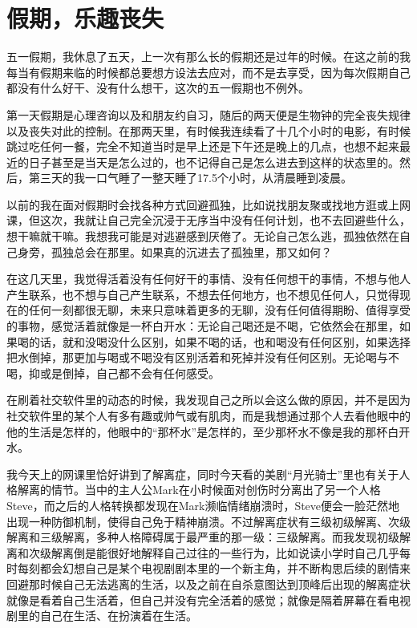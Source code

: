 \chapter{假期，乐趣丧失}








五一假期，我休息了五天，上一次有那么长的假期还是过年的时候。在这之前的我每当有假期来临的时候都总要想方设法去应对，而不是去享受，因为每次假期自己都没有什么好干、没有什么想干，这次的五一假期也不例外。

第一天假期是心理咨询以及和朋友约自习，随后的两天便是生物钟的完全丧失规律以及丧失对此的控制。在那两天里，有时候我连续看了十几个小时的电影，有时候跳过吃任何一餐，完全不知道当时是早上还是下午还是晚上的几点，也想不起来最近的日子甚至是当天是怎么过的，也不记得自己是怎么进去到这样的状态里的。然后，第三天的我一口气睡了一整天\pozhehao{}睡了17.5个小时，从清晨睡到凌晨。

以前的我在面对假期时会找各种方式回避孤独，比如说找朋友聚或找地方逛或上网课，但这次，我就让自己完全沉浸于无序当中\pozhehao{}没有任何计划，也不去回避些什么，想干嘛就干嘛。我想我可能是对逃避感到厌倦了。无论自己怎么逃，孤独依然在自己身旁，孤独总会在那里。如果真的沉进去了孤独里，那又如何？

在这几天里，我觉得活着没有任何好干的事情、没有任何想干的事情，不想与他人产生联系，也不想与自己产生联系，不想去任何地方，也不想见任何人，只觉得现在的任何一刻都很无聊，未来只意味着更多的无聊，没有任何值得期盼、值得享受的事物，感觉活着就像是一杯白开水：无论自己喝还是不喝，它依然会在那里，如果喝的话，就和没喝没什么区别，如果不喝的话，也和喝没有任何区别，如果选择把水倒掉，那更加与喝或不喝没有区别\pozhehao{}活着和死掉并没有任何区别。无论喝与不喝，抑或是倒掉，自己都不会有任何感受。

在刷着社交软件里的动态的时候，我发现自己之所以会这么做的原因，并不是因为社交软件里的某个人有多有趣或帅气或有肌肉，而是我想通过那个人去看他眼中的他的生活是怎样的，他眼中的“那杯水”是怎样的，至少那杯水不像是我的那杯白开水。

我今天上的网课里恰好讲到了解离症，同时今天看的美剧“月光骑士”里也有关于人格解离的情节。当中的主人公Mark在小时候面对创伤时分离出了另一个人格Steve，而之后的人格转换都发现在Mark濒临情绪崩溃时，Steve便会一脸茫然地出现\pozhehao{}一种防御机制，使得自己免于精神崩溃。不过解离症状有三级\pozhehao{}初级解离、次级解离和三级解离，多种人格障碍属于最严重的那一级：三级解离。而我发现初级解离和次级解离倒是能很好地解释自己过往的一些行为，比如说读小学时自己几乎每时每刻都会幻想自己是某个电视剧剧本里的一个新主角，并不断构思后续的剧情来回避那时候自己无法逃离的生活，以及之前在自杀意图达到顶峰后出现的解离症状\pozhehao{}就像是看着自己生活着，但自己并没有完全活着的感觉；就像是隔着屏幕在看电视剧里的自己在生活、在扮演着在生活。

